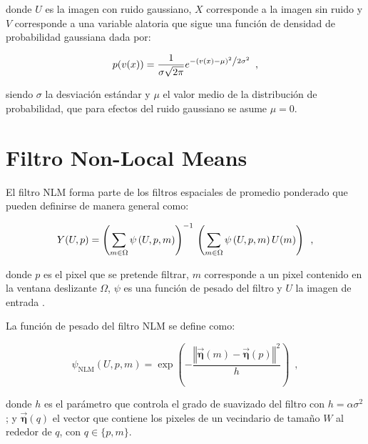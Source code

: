  donde $U$ es la imagen con ruido gaussiano, $X$ corresponde a la imagen sin ruido y $V$ corresponde a una variable alatoria que sigue una función de densidad de probabilidad gaussiana dada por: 
 
\begin{equation}
\label{eq:probfuncgauus}
p(v(x)) = \frac{1}{{\sigma \sqrt {2\pi } }}e^{{{ - \left( {v(x) - \mu } \right)^2 } \mathord{\left/ {\vphantom {{ - \left( {x - \mu } \right)^2 } {2\sigma ^2 }}} \right. \kern-\nulldelimiterspace} {2\sigma ^2 }}} \enspace ,
\end{equation}

siendo $\sigma$ la desviación est\'andar  y $\mu$ el valor medio de la distribución de probabilidad, que para efectos del ruido gaussiano se asume $\mu = 0$.


\section{Filtro Non-Local Means}
\label{ch:marco_nlm}

El filtro NLM forma parte de los filtros espaciales de promedio ponderado que pueden definirse de manera general como:

\begin{equation}
\label{eq:weighted}
Y(U,p)=\left(\sum_{m\in \Omega}\psi\left(U, p, m\right)\right)^{-1} \\ \left(\sum_{m\in \Omega}\psi\left(U, p, m\right)U(m)\right) \enspace ,
\end{equation}

donde $p$ es el pixel que se pretende filtrar, $m$ corresponde a un pixel contenido en la ventana deslizante $\Omega$, $\psi$ es una función de pesado del filtro y $U$ la imagen de entrada \cite{calderon2015dewaff}.

La función de pesado del filtro NLM se define como:

\begin{equation}
\label{eq:nlmfunc}
\psi_{\textrm{NLM}}\left(U,p,m\right) = \exp\left(-\frac{\left\Vert \vec{\boldsymbol{\eta}}\left(m\right)-\vec{\boldsymbol{\eta}}\left(p\right)\right\Vert^2 }{h}\right) \enspace ,
\end{equation}

donde $h$ es el par\'ametro que controla el grado de suavizado del filtro con $h = \alpha\sigma^{2}$; y $\vec{\boldsymbol{\eta}}\left(q\right)$ el vector que contiene los pixeles de un vecindario de tama\~no $W$ al rededor de $q$, con $q \in \{p,m\}$.

